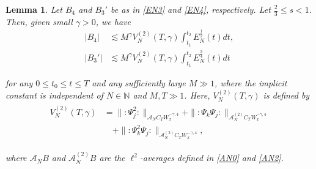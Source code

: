 \documentclass[letterpaper, 11pt,  reqno]{amsart}
\newtheorem{lemma}[theorem]{Lemma}
\newcommand{\1}{\hspace{0.5mm}\text{I}\hspace{0.2mm}}
\newcommand{\noi}{\noindent}
\newcommand{\N}{\mathbb{N}}
\newcommand{\les}{\lesssim}
\newcommand{\g}{\gamma}
\newcommand{\A}{\mathcal{A}}
\newcommand{\EN}{E_N}
\newcommand{\wick}[1]{:\!{#1}\!:}
\renewcommand{\l}{\ell}
\numberwithin{equation}{section}
\numberwithin{theorem}{section}
\begin{document}
\begin{lemma}
\label{LEM:com5} 
Let $B_4$ and $B_3'$ be as in \eqref{EN3} and \eqref{EN4}, respectively.
Let $\frac 23 \le s < 1$.
 Then, given small $\g > 0$, we have 
\begin{align} 
\label{EN6}
| B_4 | & \les M^{\g} V_N^{(2)} (T, \g) \int_{t_1}^{t_2} \EN^{\frac 12}(t) d t, \\
\label{EN7}
| B_3' | & \les M^{\g} V_N^{(2)} (T, \g) \int_{t_1}^{t_2} \EN^{\frac 34}(t) d t
\end{align} 



\noi
for any 
$0 \le t_0 \le t \le T$ and 
any sufficiently large $M \gg 1$, 
where the implicit constant is independent of 
$N \in \N$ and  $M, T \gg 1$.
Here, 
$V_N^{(2)} ( T, \g )$
is defined by 
\begin{align} 
\begin{split}
V_N^{(2)} (T, \g)
& 
= \| \wick { \Psi_j ^2} \|_{\A_N C_T W_x^{-\g, 4}} 
+ 
 \| \wick{ \Psi_k \Psi_j } \|_{\A_N^{(2)}C_T W_x^{-\g, 4}}\\
& \quad  + \| \wick{\Psi_k^2 \Psi_j} \|_{\A_N^{(2)}C_T W_x^{-\g, 4}}, 
\end{split}
\label{EN8} 
\end{align} 

\noi
where 
$\A_N B$ and $\A_N^{(2)} B$ are 
the $\l^2$-averages defined  
 in \eqref{AN0} and \eqref{AN2}.


\end{lemma} 
\end{document}
